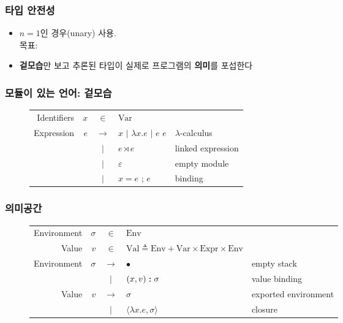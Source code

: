 \documentclass{beamer}
\theoremstyle{definition}
\newcommand*{\vbar}{|}
\newcommand*{\cons}{:\hskip-2pt:}
\newcommand*{\Expr}{\text{Expr}}
\newcommand*{\ExprVar}{\text{Var}}
\newcommand*{\Ctx}{\text{Env}}
\newcommand*{\ctx}{\sigma}
\newcommand*{\Value}{\text{Val}}
\newcommand*{\link}[2]{{#1}\rtimes{#2}}
\begin{document}
\begin{frame}[c, fragile]
  \frametitle{타입 안전성}
  \begin{itemize}
    \item $n=1$인 경우(unary) 사용.\\
          목표: 
    \item \textbf{겉모습}만 보고 추론된 타입이 실제로 프로그램의 \textbf{의미}를 포섭한다
  \end{itemize}
\end{frame}
\begin{frame}[c, fragile]
  \frametitle{모듈이 있는 언어: 겉모습}
  \begin{figure}[htb]
    \centering
    \footnotesize
    \begin{tabular}{rrcll}
      Identifiers & $x$ & $\in$         & $\ExprVar$                                                     \\
      Expression  & $e$ & $\rightarrow$ & $x$ $\vbar$ $\lambda x.e$ $\vbar$ $e$ $e$ & $\lambda$-calculus \\
                  &     & $\vbar$       & $\link{e}{e}$                             & linked expression  \\
                  &     & $\vbar$       & $\varepsilon$                             & empty module       \\
                  &     & $\vbar$       & $x=e$ ; $e$                               & binding
    \end{tabular}
  \end{figure}
\end{frame}
\begin{frame}[c, fragile]
  \frametitle{의미공간}
  \begin{figure}[h!]
    \centering
    \footnotesize
    \begin{tabular}{rrcll}
      Environment & $\ctx$ & $\in$         & $\Ctx$                                                                       \\
      Value       & $v$    & $\in$         & $\Value \triangleq\Ctx+\ExprVar\times\Expr\times\Ctx$                        \\
      Environment & $\ctx$ & $\rightarrow$ & $\bullet$                                             & empty stack          \\
                  &        & $\vbar$       & $(x,v)\cons\ctx$                                      & value binding        \\
      Value       & $v$    & $\rightarrow$ & $\ctx$                                                & exported environment \\
                  &        & $\vbar$       & $\langle \lambda x.e, \ctx \rangle$                   & closure
    \end{tabular}
  \end{figure}
\end{frame}
\end{document}
